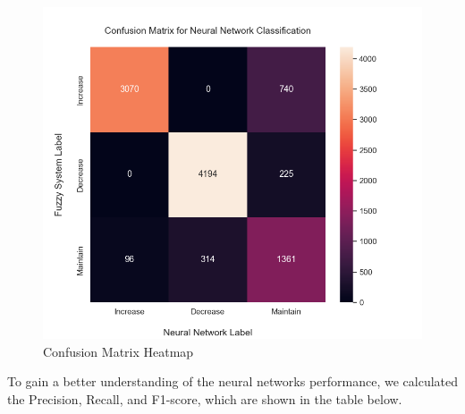 \documentclass[titlepage]{article}
\begin{document}
\begin{figure}[H]
\centering
\includegraphics[scale=0.4]{../images/classification/confusion_heatmap}
\caption{Confusion Matrix Heatmap}
\label{fig:confusion_matrix_heatmap}
\end{figure}

To gain a better understanding of the neural networks performance, we calculated the Precision, Recall, and F1-score, which are shown in the table below.

\begin{table}[H]
    \centering
    \caption{}
    \label{tab:classification_scores}
    
\end{table}
\end{document}
